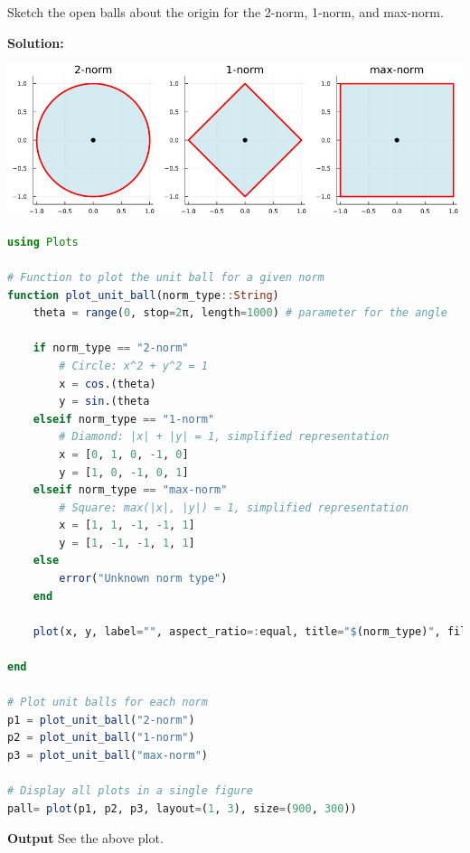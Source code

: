 \bigskip

\begin{example} Sketch the open balls about the origin for the 2-norm, 1-norm, and max-norm.    
\end{example}
\textbf{Solution:}

\bigskip
\begin{center}
    \includegraphics[width=0.95\columnwidth]{graphics/Chap09/UnitBalls.png}%
\end{center}

\bigskip
\begin{lstlisting}[language=Julia,style=mystyle]
using Plots

# Function to plot the unit ball for a given norm
function plot_unit_ball(norm_type::String)
    theta = range(0, stop=2π, length=1000) # parameter for the angle

    if norm_type == "2-norm"
        # Circle: x^2 + y^2 = 1
        x = cos.(theta)
        y = sin.(theta
    elseif norm_type == "1-norm"
        # Diamond: |x| + |y| = 1, simplified representation
        x = [0, 1, 0, -1, 0]
        y = [1, 0, -1, 0, 1]
    elseif norm_type == "max-norm"
        # Square: max(|x|, |y|) = 1, simplified representation
        x = [1, 1, -1, -1, 1]
        y = [1, -1, -1, 1, 1]
    else
        error("Unknown norm type")
    end

    plot(x, y, label="", aspect_ratio=:equal, title="$(norm_type)", fill=(0, 0.5, :lightblue), lw=3, color=:red)

end

# Plot unit balls for each norm
p1 = plot_unit_ball("2-norm")
p2 = plot_unit_ball("1-norm")
p3 = plot_unit_ball("max-norm")

# Display all plots in a single figure
pall= plot(p1, p2, p3, layout=(1, 3), size=(900, 300))
\end{lstlisting}
\textbf{Output} 
See the above plot.

\Qed

\bigskip


